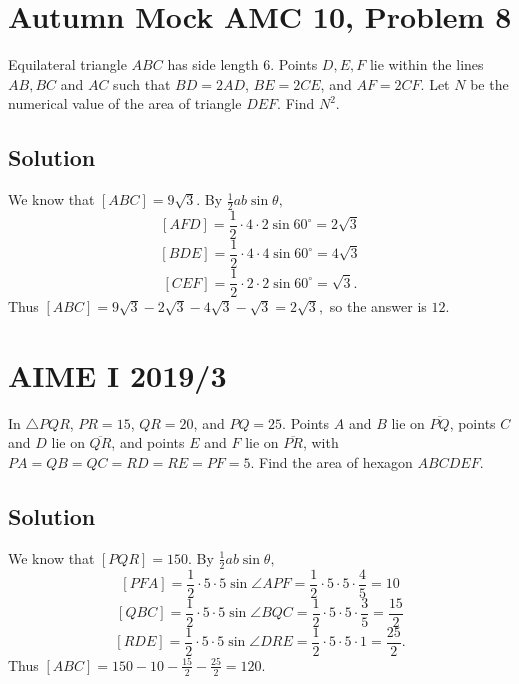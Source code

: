 \documentclass[blue,onecol]{shooting}
\begin{document}
\section{Autumn Mock AMC 10, Problem 8}
Equilateral triangle $ABC$ has side length $6$. Points $D, E, F$ lie within the lines $AB, BC$ and $AC$ such that $BD=2AD$, $BE=2CE$, and $AF=2CF$. Let $N$ be the numerical value of the area of triangle $DEF$. Find $N^2$.

\subsection{Solution}

We know that $[ABC]=9\sqrt{3}.$ By $\frac{1}{2}ab\sin\theta,$
\[[AFD]=\frac{1}{2}\cdot 4\cdot 2\sin 60^{\circ}=2\sqrt{3}\]
\[[BDE]=\frac{1}{2}\cdot 4\cdot 4\sin 60^{\circ}=4\sqrt{3}\]
\[[CEF]=\frac{1}{2}\cdot 2\cdot 2\sin 60^{\circ}=\sqrt{3}.\]
Thus $[ABC]=9\sqrt{3}-2\sqrt{3}-4\sqrt{3}-\sqrt{3}=2\sqrt{3},$ so the answer is $12.$

\begin{center}
\end{center}

\section{AIME I 2019/3}
In $\triangle PQR$, $PR=15$, $QR=20$, and $PQ=25$. Points $A$ and $B$ lie on $\overline{PQ}$, points $C$ and $D$ lie on $\overline{QR}$, and points $E$ and $F$ lie on $\overline{PR}$, with $PA=QB=QC=RD=RE=PF=5$. Find the area of hexagon $ABCDEF$.

\subsection{Solution}
We know that $[PQR]=150.$ By $\frac{1}{2}ab\sin\theta,$
\[[PFA]=\frac{1}{2}\cdot 5\cdot 5\sin \angle APF=\frac{1}{2}\cdot 5\cdot 5\cdot\frac{4}{5}=10\]
\[[QBC]=\frac{1}{2}\cdot 5\cdot 5\sin \angle BQC=\frac{1}{2}\cdot 5\cdot 5\cdot \frac{3}{5}=\frac{15}{2}\]
\[[RDE]=\frac{1}{2}\cdot 5\cdot 5\sin \angle DRE=\frac{1}{2}\cdot 5\cdot 5\cdot 1=\frac{25}{2}.\]
Thus $[ABC]=150-10-\frac{15}{2}-\frac{25}{2}=120.$
\end{document}
